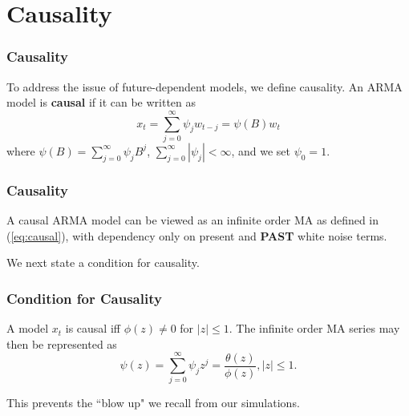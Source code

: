 \documentclass[%
xcolor=pdftex]{beamer}
\begin{document}
\section{Causality}
\frame{\tableofcontents[currentsection]}

% 
% 
% 
% 


\begin{frame}
\frametitle{Causality}

To address the issue of future-dependent models, we define causality. An ARMA model is {\bf causal} if it can be written as
\begin{equation} \label{eq:causal}
x_t=\sum_{j=0}^\infty \psi_j w_{t-j}=\psi(B) w_t
\end{equation}
where $\psi(B)=\sum_{j=0}^\infty \psi_j  B^j$, $\sum_{j=0}^\infty |\psi_j| < \infty$, and we set $\psi_0 = 1$.

\end{frame}


\begin{frame}
\frametitle{Causality}

A causal ARMA model can be viewed as an infinite order MA as defined in (\ref{eq:causal}), with dependency
only on present and \textbf{PAST} white noise terms.   
\newline

We next state a condition for causality.


\end{frame}

\begin{frame}
\frametitle{Condition for Causality}

A model $x_t$ is causal iff  $\phi(z)\neq 0$ for $|z| \leq 1$.  The infinite order MA series may then be represented as
\begin{equation} \label{eq:causal_rep}
\psi(z)=\sum_{j=0}^\infty \psi_j z^j=\frac{\theta(z)}{\phi(z)},  |z| \leq 1.
\end{equation}

This prevents the ``blow up" we recall from our simulations.

\end{frame}
\end{document}
